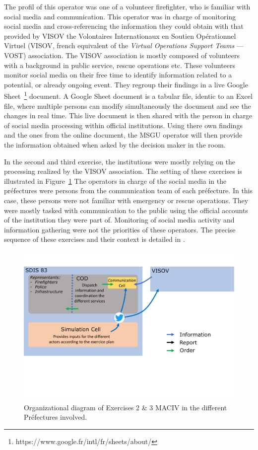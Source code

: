 The profil of this operator was one of a volunteer firefighter, who is familiar with social media and communication.
This operator was in charge of monitoring social media and cross-referencing the information they could obtain with that provided by VISOV the Volontaires Internationaux en Soutien Opérationnel Virtuel (VISOV, french equivalent of the \textit{Virtual Operations Support Teams} — VOST) association.
The VISOV association is mostly composed of volunteers with a background in public service, rescue operations etc.
These volunteers monitor social media on their free time to identify information related to a potential, or already ongoing event.
They regroup their findings in a live Google Sheet~\footnote{https://www.google.fr/intl/fr/sheets/about/} document.
A Google Sheet document is a tabular file, identic to an Excel file, where multiple persons can modify simultaneously the document and see the changes in real time.
This live document is then shared with the person in charge of social media processing within official institutions.
Using there own findings and the ones from the online document, the MSGU operator will then provide the information obtained when asked by the decision maker in the room.

In the second and third exercise, the institutions were mostly relying on the processing realized by the VISOV association.
The setting of these exercises is illustrated in Figure~\ref{information:exercise-prefecture}
The operators in charge of the social media in the préfectures were persons from the communication team of each préfecture.
In this case, these persons were not familiar with emergency or rescue operations.
They were mostly tasked with communication to the public using the official accounts of the institution they were part of.
Monitoring of social media activity and information gathering were not the priorities of these operators.
The precise sequence of these exercises and their context is detailed in \textcite{batardIntegrerContributionsCitoyennes2021}.

\begin{figure}[htb]
    \centering
    \includegraphics[width=\textwidth]{figures/chap-3/prefectures.pdf}
    \caption{Organizational diagram of Exercises 2 \& 3 MACIV in the different Préfectures involved.}
    \label{information:exercise-prefecture}
\end{figure}


